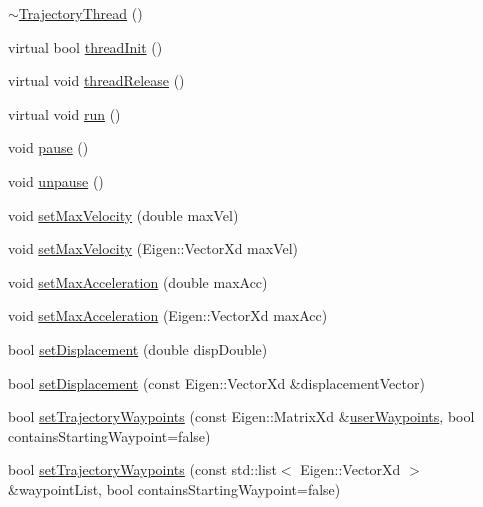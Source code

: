 \begin{DoxyCompactItemize}
\item 
\hyperlink{classocra__recipes_1_1TrajectoryThread_a7a54232683c5a3e3ef43f9b270b21c50}{$\sim$\+Trajectory\+Thread} ()
\item 
virtual bool \hyperlink{classocra__recipes_1_1TrajectoryThread_addd1165be15bc793294ad48486896377}{thread\+Init} ()
\item 
virtual void \hyperlink{classocra__recipes_1_1TrajectoryThread_a73f7ed04cf26697ca533b355930df23b}{thread\+Release} ()
\item 
virtual void \hyperlink{classocra__recipes_1_1TrajectoryThread_a835a13515f49bfa8ff047dbbaa6deb14}{run} ()
\item 
void \hyperlink{classocra__recipes_1_1TrajectoryThread_a5ca19050f1f7f7e396c558b98c9ee8d7}{pause} ()
\item 
void \hyperlink{classocra__recipes_1_1TrajectoryThread_ae5883c5bbd43285b1c548083219f709f}{unpause} ()
\item 
void \hyperlink{classocra__recipes_1_1TrajectoryThread_ab225e1df94761d6efa6d81dca8734cab}{set\+Max\+Velocity} (double max\+Vel)
\item 
void \hyperlink{classocra__recipes_1_1TrajectoryThread_a37aa3683f84bac88c1a62dc74a743ee3}{set\+Max\+Velocity} (Eigen\+::\+Vector\+Xd max\+Vel)
\item 
void \hyperlink{classocra__recipes_1_1TrajectoryThread_acdd4bc6d7613c7d4c0d995e18aaba20c}{set\+Max\+Acceleration} (double max\+Acc)
\item 
void \hyperlink{classocra__recipes_1_1TrajectoryThread_af58c0559448ddd54c3af45c2cd52bab5}{set\+Max\+Acceleration} (Eigen\+::\+Vector\+Xd max\+Acc)
\item 
bool \hyperlink{classocra__recipes_1_1TrajectoryThread_a8cff41b23344e18cd795354ba893b3e2}{set\+Displacement} (double disp\+Double)
\item 
bool \hyperlink{classocra__recipes_1_1TrajectoryThread_ab068cd5ad8d3b000c0af32311c113141}{set\+Displacement} (const Eigen\+::\+Vector\+Xd \&displacement\+Vector)
\item 
bool \hyperlink{classocra__recipes_1_1TrajectoryThread_a6e6d4ad6f800c2782b821d0048506708}{set\+Trajectory\+Waypoints} (const Eigen\+::\+Matrix\+Xd \&\hyperlink{classocra__recipes_1_1TrajectoryThread_a54a762b3cdd7330322b39f288deda6a9}{user\+Waypoints}, bool contains\+Starting\+Waypoint=false)
\item 
bool \hyperlink{classocra__recipes_1_1TrajectoryThread_adc430918f3d6bba31dd364f02134a0f1}{set\+Trajectory\+Waypoints} (const std\+::list$<$ Eigen\+::\+Vector\+Xd $>$ \&waypoint\+List, bool contains\+Starting\+Waypoint=false)

\end{DoxyCompactItemize}

